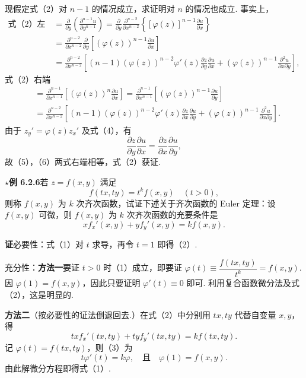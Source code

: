 \documentclass[UTF8, 12pt, fontset=fandol, oneside]{ctexart}
\begin{document}
现假定式（2）对 $n-1$ 的情况成立，求证明对 $n$ 的情况也成立. 事实上，
\[
\begin{aligned}
  \text{式（2）左端}
  &=\frac{\partial}{\partial y}\left(\frac{\partial^{n-1}u}{\partial y^{n-1}}\right)
  =\frac{\partial}{\partial y}\frac{\partial^{n-2}}{\partial x^{n-2}}
  \left\{[\varphi(z)]^{n-1}\frac{\partial u}{\partial x}\right\}\\
  &=\frac{\partial^{n-2}}{\partial x^{n-2}}\frac{\partial}{\partial y}
  \left[(\varphi(z))^{n-1}\frac{\partial u}{\partial x}\right]\\
  &=\frac{\partial^{n-2}}{\partial x^{n-2}}\left[
  (n-1)(\varphi(z))^{n-2}\varphi'(z)\frac{\partial z}{\partial y}\frac{\partial u}{\partial x}
  +(\varphi(z))^{n-1}\frac{\partial^2u}{\partial x\partial y}\right],
\end{aligned} \tag{5}
\]
式（2）右端
\[
\begin{aligned}
  &=\frac{\partial^{n-1}}{\partial x^{n-1}}\left[(\varphi(z))^n\frac{\partial u}{\partial x}\right]
  =\frac{\partial^{n-1}}{\partial x^{n-1}}\left[(\varphi(z))^{n-1}\frac{\partial u}{\partial y}\right]\\
  &=\frac{\partial^{n-2}}{\partial x^{n-2}}\left[
  (n-1)(\varphi(z))^{n-2}\varphi'(z)\frac{\partial z}{\partial x}\frac{\partial u}{\partial y}
  +(\varphi(z))^{n-1}\frac{\partial^2u}{\partial x\partial y}\right].
\end{aligned} \tag{6}
\]
由于 $z_y'=\varphi(z)z_x'$ 及式（4），有
\[
  \frac{\partial z}{\partial y}\frac{\partial u}{\partial x}
  =\frac{\partial z}{\partial x}\frac{\partial u}{\partial y},
\]
故（5），（6）两式右端相等，式（2）获证.

\noindent\textbf{\ensuremath{\star}例 6.2.6}\quad 若 $z=f(x,y)$ 满足
\[
  f(tx,ty)=t^kf(x,y)\quad(t>0), \tag{1}
\]
则称 $f(x,y)$ 为 $k$ 次齐次函数，试证下述关于齐次函数的 Euler 定理：设 $f(x,y)$ 可微，则 $f(x,y)$ 为 $k$ 次齐次函数的充要条件是
\[
  xf_x'(x,y)+yf_y'(x,y)=kf(x,y). \tag{2}
\]

\noindent\textbf{证}\quad 必要性：式（1）对 $t$ 求导，再令 $t=1$ 即得（2）.

充分性：\textbf{方法一}\quad 要证 $t>0$ 时（1）成立，即要证 $\varphi(t)\equiv\dfrac{f(tx,ty)}{t^k}=f(x,y)$. 因 $\varphi(1)=f(x,y)$，因此只要证明 $\varphi'(t)\equiv0$ 即可. 利用复合函数微分法及式（2），这是明显的.

\textbf{方法二}\quad （按必要性的证法倒退回去.）在式（2）中分别用 $tx,ty$ 代替自变量 $x,y$，得
\[
  txf_x'(tx,ty)+tyf_y'(tx,ty)=kf(tx,ty). \tag{3}
\]
记 $\varphi(t)=f(tx,ty)$，则（3）为
\[
  t\varphi'(t)=k\varphi,\quad \text{且}\quad \varphi(1)=f(x,y).
\]
由此解微分方程即得式（1）.
\end{document}
